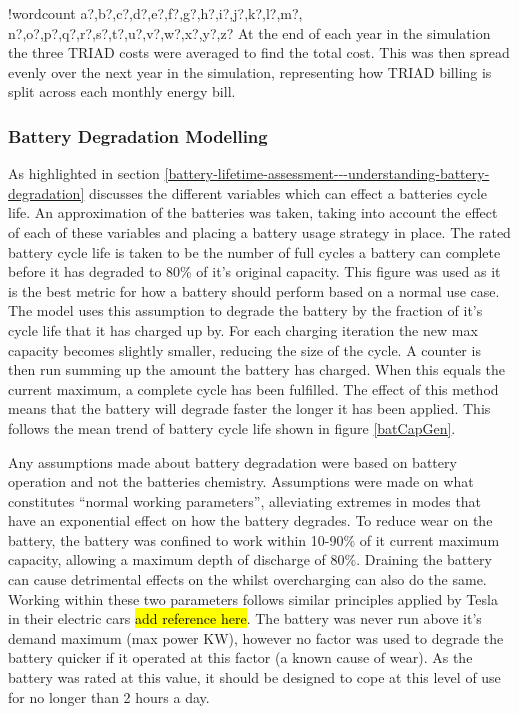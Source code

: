 \documentclass[fontsize=9.5pt]{extarticle}
\numberwithin{figure}{section} %
\newcounter{words}
\newenvironment{counted}{%
  \setcounter{words}{0}
  \SearchList!{wordcount}{\stepcounter{words}}
    {a?,b?,c?,d?,e?,f?,g?,h?,i?,j?,k?,l?,m?,
    n?,o?,p?,q?,r?,s?,t?,u?,v?,w?,x?,y?,z?}
  \UndoBoundary{'}
  \SearchOrder{p;}}{%
  \StopSearching}
\begin{document}
\begin{counted}
At the end of each year in the simulation the three TRIAD costs were
averaged to find the total cost. This was then spread evenly over the
next year in the simulation, representing how TRIAD billing is split
across each monthly energy bill.

\subsubsection{Battery Degradation
Modelling}\label{battery-degradation-modelling}

As highlighted in section
\ref{battery-lifetime-assessment---understanding-battery-degradation}
discusses the different variables which can effect a batteries cycle
life. An approximation of the batteries was taken, taking into account
the effect of each of these variables and placing a battery usage
strategy in place. The rated battery cycle life is taken to be the
number of full cycles a battery can complete before it has degraded to
80\% of it's original capacity. This figure was used as it is the best
metric for how a battery should perform based on a normal use case. The
model uses this assumption to degrade the battery by the fraction of
it's cycle life that it has charged up by. For each charging iteration
the new max capacity becomes slightly smaller, reducing the size of the
cycle. A counter is then run summing up the amount the battery has
charged. When this equals the current maximum, a complete cycle has been
fulfilled. The effect of this method means that the battery will degrade
faster the longer it has been applied. This follows the mean trend of
battery cycle life shown in figure \ref{batCapGen}.

Any assumptions made about battery degradation were based on battery
operation and not the batteries chemistry. Assumptions were made on what
constitutes ``normal working parameters'', alleviating extremes in modes
that have an exponential effect on how the battery degrades. To reduce
wear on the battery, the battery was confined to work within 10-90\% of
it current maximum capacity, allowing a maximum depth of discharge of
80\%. Draining the battery can cause detrimental effects on the whilst
overcharging can also do the same. Working within these two parameters
follows similar principles applied by Tesla in their electric cars
\hl{add reference here}. The battery was never run above it's demand
maximum (max power KW), however no factor was used to degrade the
battery quicker if it operated at this factor (a known cause of wear).
As the battery was rated at this value, it should be designed to cope at
this level of use for no longer than 2 hours a day.


\end{counted}
\end{document}
